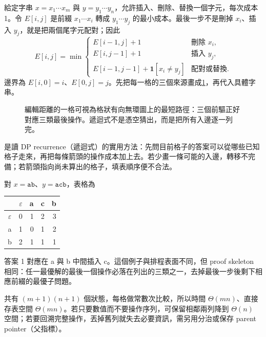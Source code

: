 \documentclass[11pt,a4paper,oneside,openany]{book}
\begin{document}
\begin{example}
給定字串 $x=x_1\cdots x_m$ 與 $y=y_1\cdots y_n$，允許插入、刪除、替換一個字元，每次成本 1。令 $E[i,j]$ 是前綴 $x_1\cdots x_i$ 轉成 $y_1\cdots y_j$ 的最小成本。最後一步不是刪掉 $x_i$、插入 $y_j$，就是把兩個尾字元配對；因此
\[
 E[i,j]=\min\begin{cases}
 E[i-1,j]+1 & \text{刪除 }x_i,\\
 E[i,j-1]+1 & \text{插入 }y_j,\\
 E[i-1,j-1]+\mathbf 1[x_i\ne y_j] & \text{配對或替換}.
 \end{cases}
\]
邊界為 $E[i,0]=i$、$E[0,j]=j$。先把每一格的三個來源畫成\cref{fig:edit-dependency}，再代入具體字串。
\begin{figure}[htbp]
\centering
{}
\caption{編輯距離的一格可視為格狀有向無環圖上的最短路徑：三個前驅正好對應三類最後操作。遞迴式不是憑空猜出，而是把所有入邊逐一列完。}
\label{fig:edit-dependency}
\end{figure}

 是讀 DP recurrence（遞迴式）的實用方法：先問目前格子的答案可以從哪些已知格子走來，再把每條箭頭的操作成本加上去。若少畫一條可能的入邊，轉移不完備；若箭頭指向尚未算出的格子，填表順序便不合法。

對 $x=\texttt{ab}$、$y=\texttt{acb}$，表格為
\begin{center}
\begin{tabular}{@{}c|rrrr@{}}
 & $\varepsilon$ & a & c & b \\
\midrule
$\varepsilon$ & 0&1&2&3\\
a & 1&0&1&2\\
b & 2&1&1&1\\
\end{tabular}
\end{center}
答案 1 對應在 a 與 b 中間插入 c。這個例子與排程表面不同，但 proof skeleton 相同：任一最優解的最後一個操作必落在列出的三類之一，去掉最後一步後剩下相應前綴的最優子問題。

共有 $(m+1)(n+1)$ 個狀態，每格做常數次比較，所以時間 $\Theta(mn)$、直接存表空間 $\Theta(mn)$。若只要數值而不要操作序列，可保留相鄰兩列降到 $\Theta(n)$ 空間；若要回溯完整操作，丟掉舊列就失去必要資訊，需另用分治或保存 parent pointer（父指標）。
\end{example}
\end{document}
